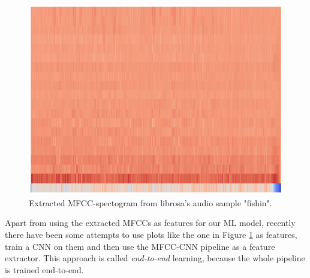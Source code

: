 \begin{figure}[h]
  \centering
  \includegraphics[width=.95\textwidth]{images/mfcc-spec.eps}
  \caption{Extracted MFCC-spectogram from librosa's audio sample "fishin".}
  \label{fig:mfcc}
\end{figure}
Apart from using the extracted MFCCs as features for our ML model, recently there have been some attempts to use plots like the one in Figure \ref{fig:mfcc} as features, train a CNN on them and then use the MFCC-CNN pipeline as a feature extractor.
This approach is called \textit{end-to-end} learning, because the whole pipeline is trained end-to-end.


